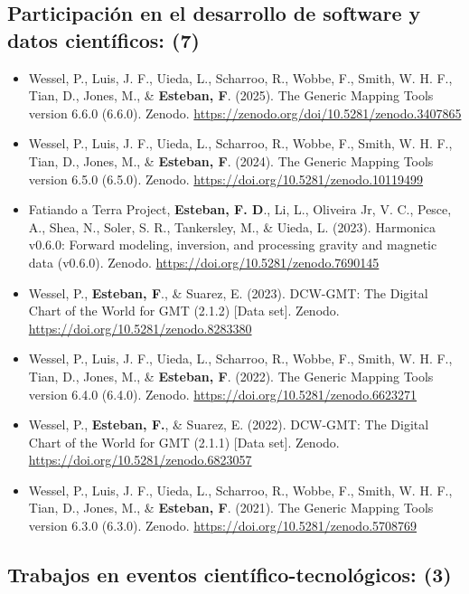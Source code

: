 \documentclass[11pt, a4paper]{article}
\begin{document}
\subsection{Participación en el desarrollo de software y datos científicos: (7)}

\begin{itemize}
    \item Wessel, P., Luis, J. F., Uieda, L., Scharroo, R., Wobbe, F., Smith, W. H. F., Tian, D., Jones, M., \& \textbf{Esteban, F}. (2025). The Generic Mapping Tools version 6.6.0 (6.6.0). Zenodo. \url{https://zenodo.org/doi/10.5281/zenodo.3407865}
    \item Wessel, P., Luis, J. F., Uieda, L., Scharroo, R., Wobbe, F., Smith, W. H. F., Tian, D., Jones, M., \& \textbf{Esteban, F}. (2024). The Generic Mapping Tools version 6.5.0 (6.5.0). Zenodo. \url{https://doi.org/10.5281/zenodo.10119499}
    \item Fatiando a Terra Project, \textbf{Esteban, F. D}., Li, L., Oliveira Jr, V. C., Pesce, A., Shea, N., Soler, S. R., Tankersley, M., \& Uieda, L. (2023). Harmonica v0.6.0: Forward modeling, inversion, and processing gravity and magnetic data (v0.6.0). Zenodo. \url{https://doi.org/10.5281/zenodo.7690145}
    \item Wessel, P., \textbf{Esteban, F}., \& Suarez, E. (2023). DCW-GMT: The Digital Chart of the World for GMT (2.1.2) [Data set]. Zenodo. \url{https://doi.org/10.5281/zenodo.8283380}
    \item Wessel, P., Luis, J. F., Uieda, L., Scharroo, R., Wobbe, F., Smith, W. H. F., Tian, D., Jones, M., \& \textbf{Esteban, F}. (2022). The Generic Mapping Tools version 6.4.0 (6.4.0). Zenodo. \url{https://doi.org/10.5281/zenodo.6623271}
    \item Wessel, P., \textbf{Esteban, F.}, \& Suarez, E. (2022). DCW-GMT: The Digital Chart of the World for GMT (2.1.1) [Data set]. Zenodo. \url{https://doi.org/10.5281/zenodo.6823057}
    \item Wessel, P., Luis, J. F., Uieda, L., Scharroo, R., Wobbe, F., Smith, W. H. F., Tian, D., Jones, M., \& \textbf{Esteban, F}. (2021). The Generic Mapping Tools version 6.3.0 (6.3.0). Zenodo. \url{https://doi.org/10.5281/zenodo.5708769}
\end{itemize}


\subsection{Trabajos en eventos científico-tecnológicos: (3)}
\end{document}
